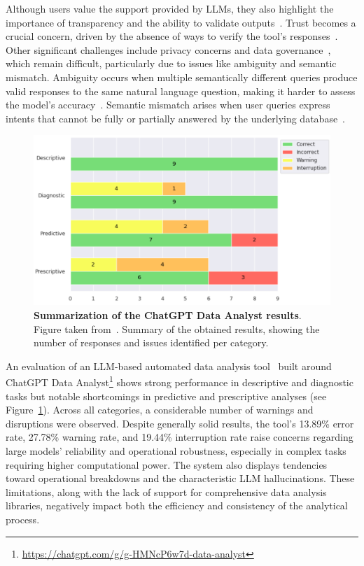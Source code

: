 \documentclass{DESSThesis}
\begin{document}
Although users value the support provided by LLMs, they also highlight the importance of transparency and the ability to validate outputs~\cite{10.1145/3613905.3651042}. Trust becomes a crucial concern, driven by the absence of ways to verify the tool's responses~\cite{10.1145/3613905.3651042}. Other significant challenges include privacy concerns and data governance~\cite{10.1145/3737873}, which remain difficult, particularly due to issues like ambiguity and semantic mismatch. Ambiguity occurs when multiple semantically different queries produce valid responses to the same natural language question, making it harder to assess the model's accuracy~\cite{10.1145/3737873}. Semantic mismatch arises when user queries express intents that cannot be fully or partially answered by the underlying database~\cite{10.1145/3737873}.

\begin{figure}[htb!]
	\centering
	\includegraphics[width=0.75\linewidth]{img/Related Work/gpt_data_analyst_results.png}
	\caption[Summarization of the ChatGPT Data Analyst results]{\textbf{Summarization of the ChatGPT Data Analyst results}. Figure taken from~\cite{sbbd}. Summary of the obtained results, showing the number of responses and issues identified per category.}
	\label{fig:gpt_data_analyst_results}
\end{figure}

An evaluation of an LLM-based automated data analysis tool~\cite{sbbd} built around ChatGPT Data Analyst\footnote{\url{https://chatgpt.com/g/g-HMNcP6w7d-data-analyst}} shows strong performance in descriptive and diagnostic tasks but notable shortcomings in predictive and prescriptive analyses (see Figure~\ref{fig:gpt_data_analyst_results}). Across all categories, a considerable number of warnings and disruptions were observed. Despite generally solid results, the tool's 13.89\% error rate, 27.78\% warning rate, and 19.44\% interruption rate raise concerns regarding large models' reliability and operational robustness, especially in complex tasks requiring higher computational power. The system also displays tendencies toward operational breakdowns and the characteristic LLM hallucinations. These limitations, along with the lack of support for comprehensive data analysis libraries, negatively impact both the efficiency and consistency of the analytical process.
\end{document}
